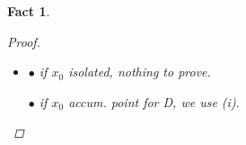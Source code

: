\documentclass[12pt]{amsbook}
\newtheorem{fact}[theorem]{Fact}
\theoremstyle{definition}
\begin{document}
\begin{fact}
\begin{proof}
\begin{itemize}
\begin{itemize}
	Take $\delta := \min\{\delta_1, \ldots, \delta_q\} > 0$.
	
	Then $\forall j = 1, \ldots, q$, if $\|x-x_0\|_\infty < \delta \leq \delta_j$ then $|f_j(x) - y^{(0)}_j| < \epsilon$ hence \begin{equation*} \|f(x) - y^{(0)}\|_\infty = \max_{j=1}^q \{|f_j(x) - y^{(0)}_j|\} < \epsilon. \end{equation*}
	\end{itemize}
	
    \item[(ii)]
    $\bullet$ if $x_0$ isolated, nothing to prove.
    
    $\bullet$ if $x_0$ accum. point for D, we use (i). %
    \end{itemize}
    \end{proof}

\end{fact}

\end{document}
